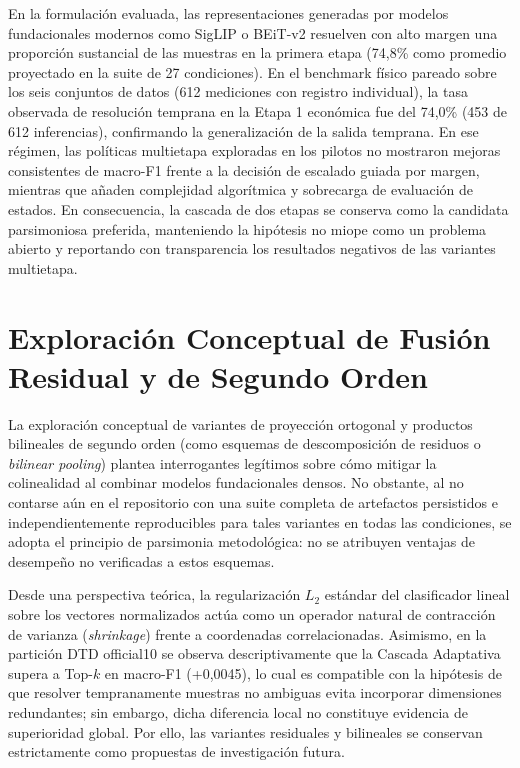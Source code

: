 En la formulación evaluada, las representaciones generadas por modelos fundacionales modernos como SigLIP o BEiT-v2 resuelven con alto margen una proporción sustancial de las muestras en la primera etapa (74,8\% como promedio proyectado en la suite de 27 condiciones). En el benchmark físico pareado sobre los seis conjuntos de datos (612 mediciones con registro individual), la tasa observada de resolución temprana en la Etapa 1 económica fue del 74{,}0\% (453 de 612 inferencias), confirmando la generalización de la salida temprana. En ese régimen, las políticas multietapa exploradas en los pilotos no mostraron mejoras consistentes de macro-F1 frente a la decisión de escalado guiada por margen, mientras que añaden complejidad algorítmica y sobrecarga de evaluación de estados. En consecuencia, la cascada de dos etapas se conserva como la candidata parsimoniosa preferida, manteniendo la hipótesis no miope como un problema abierto y reportando con transparencia los resultados negativos de las variantes multietapa.

\section{Exploración Conceptual de Fusión Residual y de Segundo Orden}

La exploración conceptual de variantes de proyección ortogonal y productos bilineales de segundo orden (como esquemas de descomposición de residuos o \emph{bilinear pooling}) plantea interrogantes legítimos sobre cómo mitigar la colinealidad al combinar modelos fundacionales densos. No obstante, al no contarse aún en el repositorio con una suite completa de artefactos persistidos e independientemente reproducibles para tales variantes en todas las condiciones, se adopta el principio de parsimonia metodológica: no se atribuyen ventajas de desempeño no verificadas a estos esquemas.

Desde una perspectiva teórica, la regularización $L_2$ estándar del clasificador lineal sobre los vectores normalizados actúa como un operador natural de contracción de varianza (\emph{shrinkage}) frente a coordenadas correlacionadas. Asimismo, en la partición DTD official10 se observa descriptivamente que la Cascada Adaptativa supera a Top-$k$ en macro-F1 (+0,0045), lo cual es compatible con la hipótesis de que resolver tempranamente muestras no ambiguas evita incorporar dimensiones redundantes; sin embargo, dicha diferencia local no constituye evidencia de superioridad global. Por ello, las variantes residuales y bilineales se conservan estrictamente como propuestas de investigación futura.

